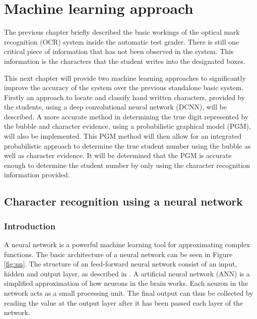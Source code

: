 \chapter{Machine learning approach}
\label{ch:MachineLearning}
\graphicspath{{Chapter4/Chapter4Figures/}}
The previous chapter briefly described the basic workings of the optical mark recognition (OCR) system inside the automatic test grader. There is still one critical piece of information that has not been observed in the system. This information is the characters that the student writes into the designated boxes.

This next chapter will provide two machine learning approaches to significantly improve the accuracy of the system over the previous standalone basic system. Firstly an approach to locate and classify hand written characters, provided by the students, using a deep convolutional neural network (DCNN), will be described. A more accurate method in determining the true digit represented by the bubble and character evidence, using a probabilistic  graphical model (PGM), will also be implemented. This PGM method will then allow for an integrated probabilistic approach to determine the true student number using the bubble as well as character evidence. It will be determined that the PGM is accurate enough to determine the student number by only using the character recognition information provided.

\section{Character recognition using a neural network}

\subsection{Introduction}

A neural network is a powerful machine learning tool for approximating complex functions. The basic architecture of a neural network can be seen in Figure \ref{fig:nn}. The structure of an feed-forward neural network consist of an input, hidden and output layer, as described in \citet{MichealN2015}. A artificial neural network (ANN) is a simplified approximation of how neurons in the brain works. Each neuron in the network acts as a small processing unit. The final output can thus be collected by reading the value at the output layer after it has been passed each layer of the network.

